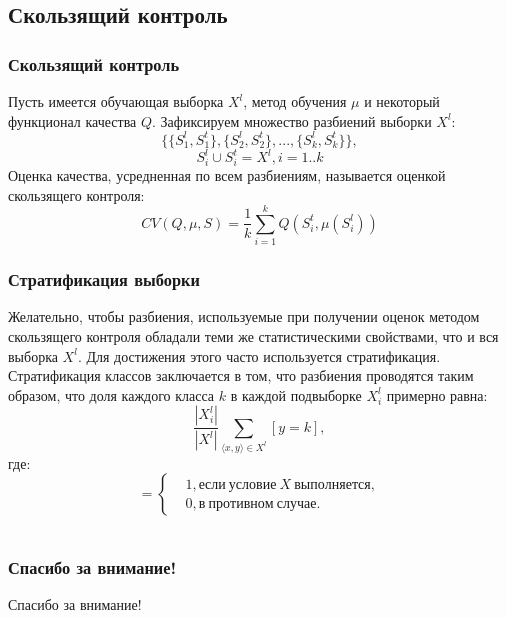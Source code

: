 \documentclass{beamer}
\begin{document}
\subsection{Скользящий контроль}
\begin{frame}
\frametitle{Скользящий контроль}
	Пусть имеется обучающая выборка $X^l$, метод обучения $\mu$ и некоторый функционал качества $Q$. Зафиксируем множество разбиений выборки $X^l$:
	$$\{\{S_1^l,S_1^t\},\{S_2^l,S_2^t\},...,\{S_k^l,S_k^t\}\},$$
	$$S_i^l \cup S_i^t = X^l, i=1..k$$
	Оценка качества, усредненная по всем разбиениям, называется оценкой скользящего контроля:
	$$CV(Q,\mu,S)=\frac{1}{k}\sum\limits_{i=1}^{k}Q(S_i^t,\mu(S_i^l))$$
\end{frame}

\begin{frame}
\frametitle{Стратификация выборки}
	Желательно, чтобы разбиения, используемые при получении оценок методом скользящего контроля обладали теми же статистическими свойствами, что и вся выборка $X^l$. Для достижения этого часто используется стратификация.
	\newline
	\newline
	Стратификация классов заключается в том, что разбиения проводятся таким образом, что доля каждого класса $k$ в каждой подвыборке $X_i^l$ примерно равна:
	$$\frac{|X_i^l|}{|X^l|}\sum\limits_{\langle x,y \rangle \in X^l}^{}[y=k],$$
	где:\\
	\begin{equation*}
	[X]=
	\begin{cases}
	&1, если\ условие\ X\ выполняется,\\
	&0, в\ противном\ случае.
	\end{cases}
	\end{equation*}
\end{frame}

\section{}
\begin{frame}
\frametitle{Спасибо за внимание!}
	Спасибо за внимание!
\end{frame}
\end{document}
